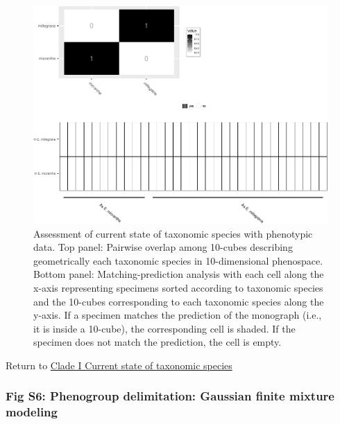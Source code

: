 \documentclass[
  11pt,
]{article}
\begin{document}
\begin{figure}
\includegraphics{Supplementary_Material_files/figure-latex/currentStateOfTaxonomyCladeIPlots-1} \caption{Assessment of current state of taxonomic species with phenotypic data. Top panel: Pairwise overlap among 10-cubes describing geometrically each taxonomic species in 10-dimensional phenospace. Bottom panel: Matching-prediction analysis with each cell along the x-axis representing specimens sorted according to taxonomic species and the 10-cubes corresponding to each taxonomic species along the y-axis. If a specimen matches the prediction of the monograph (i.e., it is inside a 10-cube), the corresponding cell is shaded. If the specimen does not match the prediction, the cell is empty.}\label{fig:currentStateOfTaxonomyCladeIPlots}
\end{figure}

Return to \protect\hyperlink{current-state-of-taxonomic-species}{Clade I Current state of taxonomic species}
\pagebreak

\hypertarget{fig-s6-phenogroup-delimitation-gaussian-finite-mixture-modeling}{%
\subsubsection{Fig S6: Phenogroup delimitation: Gaussian finite mixture modeling}\label{fig-s6-phenogroup-delimitation-gaussian-finite-mixture-modeling}}
\end{document}

